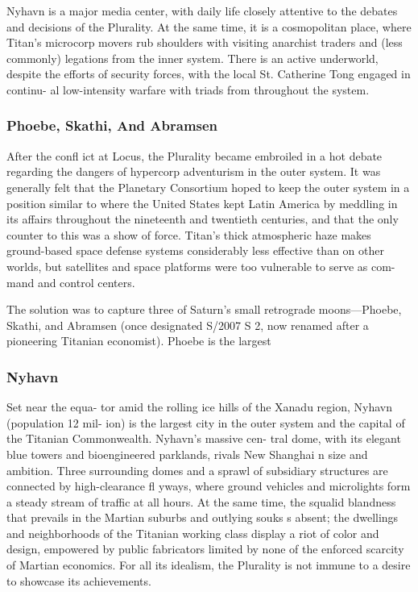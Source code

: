 Nyhavn is a major media center, with daily life 
closely attentive to the debates and decisions of 
the Plurality. At the same time, it is a cosmopolitan 
place, where Titan's microcorp movers rub shoulders 
with visiting anarchist traders and (less commonly) 
legations from the inner system. There is an active 
underworld, despite the efforts of security forces, 
with the local St. Catherine Tong engaged in continu-
al low-intensity warfare with triads from throughout 
the system.

\subsubsection{Phoebe, Skathi, And Abramsen}

After the confl ict at Locus, the Plurality became 
embroiled in a hot debate regarding the dangers of 
hypercorp adventurism in the outer system. It was 
generally felt that the Planetary Consortium hoped to 
keep the outer system in a position similar to where 
the United States kept Latin America by meddling in 
its affairs throughout the nineteenth and twentieth 
centuries, and that the only counter to this was a 
show of force. Titan's thick atmospheric haze makes 
ground-based space defense systems considerably 
less effective than on other worlds, but satellites and 
space platforms were too vulnerable to serve as com-
mand and control centers.

The solution was to capture three of Saturn's small 
retrograde moons—Phoebe, Skathi, and Abramsen 
(once designated S/2007 S 2, now renamed after a 
pioneering Titanian economist). Phoebe is the largest 

\subsubsection{Nyhavn}

Set near the equa-
tor amid the rolling ice 
hills of  the Xanadu region, 
Nyhavn (population 12 mil-
ion) is the largest city in the outer
system and the capital of the Titanian 
Commonwealth. Nyhavn's massive cen-
tral dome, with its elegant blue towers and 
bioengineered parklands, rivals New Shanghai 
n size and ambition. Three surrounding  domes 
and a sprawl of subsidiary structures are connected
by  high-clearance  fl yways, where  ground vehicles
and microlights form a steady stream of traffic at all
hours. At the same time, the squalid blandness that
prevails in the Martian suburbs and outlying souks
s absent; the dwellings and neighborhoods of the 
Titanian working class display a riot of color and
design, empowered by public fabricators limited by
none of the enforced scarcity of Martian economics.
For all its idealism, the Plurality is not immune to a
desire to showcase its achievements.

